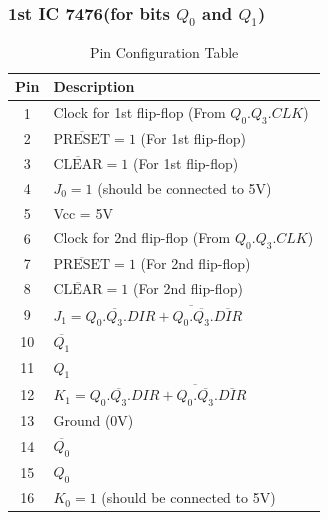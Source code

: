 \documentclass[a4paper,12pt]{article}
\begin{document}
\subsubsection{1st IC 7476(for bits $Q_0$ and $Q_1$)}
\begin{table}[H]
    \centering
    \renewcommand{\arraystretch}{1.3} %
    \begin{tabular}{|c|l|}
        \hline
        \textbf{Pin} & \textbf{Description} \\ 
        \hline
        1  & Clock for 1st flip-flop (From $Q_0.Q_3.CLK$) \\ 
        2  & $\overline{\text{PRESET}} = 1$ (For 1st flip-flop) \\ 
        3  & $\overline{\text{CLEAR}} = 1$ (For 1st flip-flop) \\ 
        4  & $J_0 = 1$ (should be connected to 5V) \\ 
        5  & Vcc = 5V \\ 
        6  & Clock for 2nd flip-flop (From $Q_0.Q_3.CLK$)\\ 
        7  & $\overline{\text{PRESET}} = 1$ (For 2nd flip-flop) \\ 
        8  & $\overline{\text{CLEAR}} = 1$ (For 2nd flip-flop) \\ 
        9  & $J_1 = Q_0.\overline{Q_3}.DIR+\overline{Q_0.\overline{Q_3}}.\overline{DIR}$ \\ 
        10 & $\overline{Q_1}$ \\ 
        11 & $Q_1$ \\ 
        12 & $K_1 = Q_0.\overline{Q_3}.DIR+\overline{Q_0.\overline{Q_3}}.\overline{DIR}$ \\ 
        13 & Ground (0V) \\ 
        14 & $\overline{Q_0}$ \\ 
        15 & $Q_0$ \\ 
        16 & $K_0 = 1$ (should be connected to 5V) \\ 
        \hline
    \end{tabular}
    \caption{Pin Configuration Table}
    \label{tab:pin_config_1}
\end{table}
\end{document}
